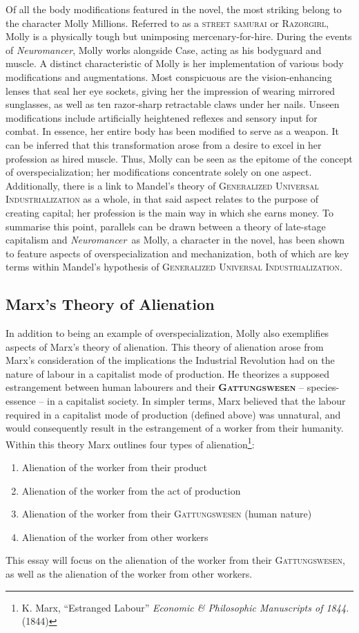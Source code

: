 \documentclass[11pt]{article}
\newcommand\neuro{\textit{Neuromancer}}
\newcommand\addtotocsubsection[1]{\addcontentsline{toc}{subsection}{#1}}
\newcommand\marxref{K. Marx, ``Estranged Labour'' \textit{Economic \& Philosophic Manuscripts of 1844.} (1844)}
\begin{document}
	Of all the body modifications featured in the novel, the most striking belong to the character Molly Millions. Referred to as a \textsc{street samurai} or \textsc{Razorgirl}, Molly is a physically tough but unimposing mercenary-for-hire. During the events of \neuro, Molly works alongside Case, acting as his bodyguard and muscle. A distinct characteristic of Molly is her implementation of various body modifications and augmentations. Most conspicuous are the vision-enhancing lenses that seal her eye sockets, giving her the impression of wearing mirrored sunglasses, as well as ten razor-sharp retractable claws under her nails. Unseen modifications include artificially heightened reflexes and sensory input for combat. In essence, her entire body has been modified to serve as a weapon. It can be inferred that this transformation arose from a desire to excel in her profession as hired muscle. Thus, Molly can be seen as the epitome of the concept of overspecialization; her modifications concentrate solely on one aspect. Additionally, there is a link to Mandel’s theory of \textsc{Generalized Universal Industrialization} as a whole, in that said aspect relates to the purpose of creating capital; her profession is the main way in which she earns money.
	\smallbreak\indent
	To summarise this point, parallels can be drawn between a theory of late-stage capitalism and \neuro\ as Molly, a character in the novel, has been shown to feature aspects of overspecialization and mechanization, both of which are key terms within Mandel’s hypothesis of \textsc{Generalized Universal Industrialization}.
	
	\subsection*{Marx's Theory of Alienation}\addtotocsubsection{Marx's Theory of Alienation}
	In addition to being an example of overspecialization, Molly also exemplifies aspects of Marx's theory of alienation. This theory of alienation arose from Marx's consideration of the implications the Industrial Revolution had on the nature of labour in a capitalist mode of production. He theorizes a supposed estrangement between human labourers and their \textbf{\textsc{Gattungswesen}} – species-essence – in a capitalist society. In simpler terms, Marx believed that the labour required in a capitalist mode of production (defined above) was unnatural, and would consequently result in the estrangement of a worker from their humanity. Within this theory Marx outlines four types of alienation\footnote{\marxref}:
	\begin{enumerate}
		\item Alienation of the worker from their product
		\item Alienation of the worker from the act of production
		\item Alienation of the worker from their \textsc{Gattungswesen} (human nature)
		\item Alienation of the worker from other workers
	\end{enumerate}
	This essay will focus on the alienation of the worker from their \textsc{Gattungswesen}, as well as the alienation of the worker from other workers.
	
\end{document}
